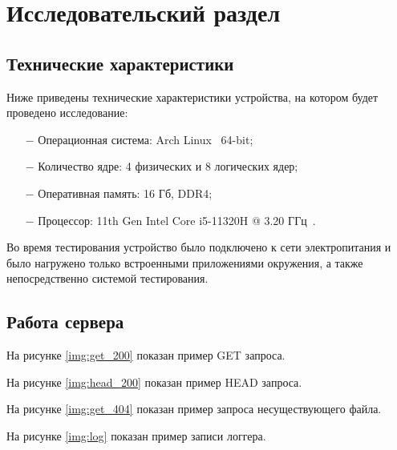 \section{Исследовательский раздел}

\subsection{Технические характеристики}

Ниже приведены технические характеристики устройства, на котором будет проведено исследование:

\begin{itemize}
    \item[$-$] Операционная система: Arch Linux~\cite{arch-linux} 64-bit;
        \item[$-$] Количество ядре: 4 физических и 8 логических ядер;
    \item[$-$] Оперативная память: 16 Гб, DDR4;
    \item[$-$] Процессор: 11th Gen Intel\textsuperscript{\tiny\textregistered} Core\textsuperscript{\tiny\texttrademark} i5-11320H @ 3.20 ГГц~\cite{i5}.
\end{itemize}

Во время тестирования устройство было подключено к сети электропитания и было нагружено только встроенными приложениями окружения, а также непосредственно системой тестирования.

\subsection{Работа сервера}

На рисунке \ref{img:get_200} показан пример GET запроса.


На рисунке \ref{img:head_200} показан пример HEAD запроса.


На рисунке \ref{img:get_404} показан пример запроса несуществующего файла.


\clearpage

На рисунке \ref{img:log} показан пример записи логгера.



